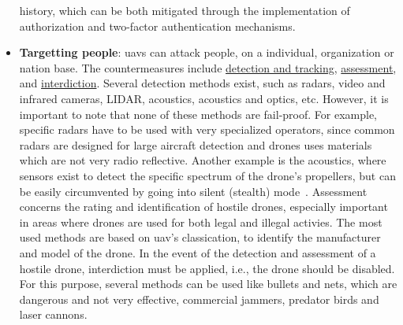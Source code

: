 \begin{itemize}
  history, which can be both mitigated through the implementation of
  authorization and two-factor authentication mechanisms.
\item \textbf{Targetting people}: \glspl{uav} can attack people, on a
  individual, organization or nation base. The countermeasures include
  \underline{detection and tracking}, \underline{assessment}, and
  \underline{interdiction}. Several detection methods exist, such as radars,
  video and infrared cameras, LIDAR, acoustics, acoustics and optics,
  etc. However, it is important to note that none of these methods are
  fail-proof. For example, specific radars have to be used with very specialized
  operators, since common radars are designed for large aircraft detection and
  drones uses materials which are not very radio reflective. Another example is
  the acoustics, where sensors exist to detect the specific spectrum of the
  drone's propellers, but can be easily circumvented by going into silent
  (stealth) mode~\cite{sathyamoorthy2015review}. Assessment concerns the rating
  and identification of hostile drones, especially important in areas where
  drones are used for both legal and illegal activies. The most used methods are
  based on \gls{uav}'s classication, to identify the manufacturer and model of
  the drone. In the event of the detection and assessment of a hostile drone,
  interdiction must be applied, i.e., the drone should be disabled. For this
  purpose, several methods can be used like bullets and nets, which are
  dangerous and not very effective, commercial jammers, predator birds and laser
  cannons.
\end{itemize}

